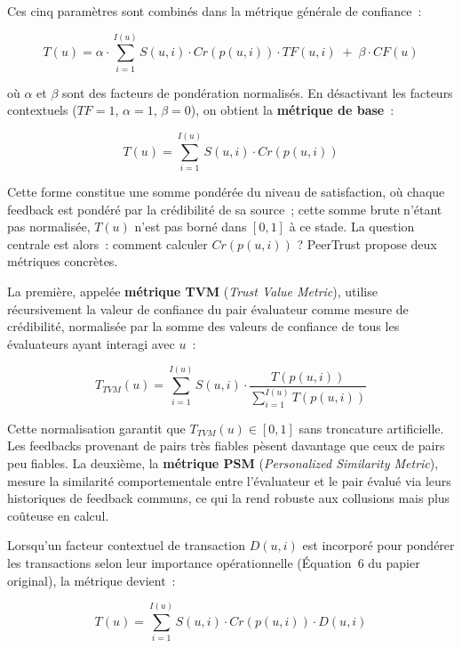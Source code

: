 Ces cinq paramètres sont combinés dans la métrique générale de confiance~:

\begin{equation}
\label{eq:peertrust_general}
T(u) = \alpha \cdot \sum_{i=1}^{I(u)} S(u,i) \cdot Cr(p(u,i)) \cdot TF(u,i)\; +\; \beta \cdot CF(u)
\end{equation}

où $\alpha$ et $\beta$ sont des facteurs de pondération normalisés. En désactivant les facteurs contextuels ($TF = 1$, $\alpha = 1$, $\beta = 0$), on obtient la \textbf{métrique de base}~:

\begin{equation}
\label{eq:peertrust_basic}
T(u) = \sum_{i=1}^{I(u)} S(u,i) \cdot Cr(p(u,i))
\end{equation}

Cette forme constitue une somme pondérée du niveau de satisfaction, où chaque feedback est pondéré par la crédibilité de sa source~; cette somme brute n'étant pas normalisée, $T(u)$ n'est pas borné dans $[0,1]$ à ce stade. La question centrale est alors~: comment calculer $Cr(p(u,i))$ ? PeerTrust propose deux métriques concrètes.

La première, appelée \textbf{métrique TVM} (\textit{Trust Value Metric}), utilise récursivement la valeur de confiance du pair évaluateur comme mesure de crédibilité, normalisée par la somme des valeurs de confiance de tous les évaluateurs ayant interagi avec $u$~:

\begin{equation}
\label{eq:peertrust_tvm}
T_{TVM}(u) = \sum_{i=1}^{I(u)} S(u,i) \cdot \frac{T(p(u,i))}{\displaystyle\sum_{i=1}^{I(u)} T(p(u,i))}
\end{equation}

Cette normalisation garantit que $T_{TVM}(u) \in [0,1]$ sans troncature artificielle. Les feedbacks provenant de pairs très fiables pèsent davantage que ceux de pairs peu fiables. La deuxième, la \textbf{métrique PSM} (\textit{Personalized Similarity Metric}), mesure la similarité comportementale entre l'évaluateur et le pair évalué via leurs historiques de feedback communs, ce qui la rend robuste aux collusions mais plus coûteuse en calcul.

Lorsqu'un facteur contextuel de transaction $D(u,i)$ est incorporé pour pondérer les transactions selon leur importance opérationnelle (Équation~6 du papier original), la métrique devient~:

\begin{equation}
\label{eq:peertrust_D}
T(u) = \sum_{i=1}^{I(u)} S(u,i) \cdot Cr(p(u,i)) \cdot D(u,i)
\end{equation}


